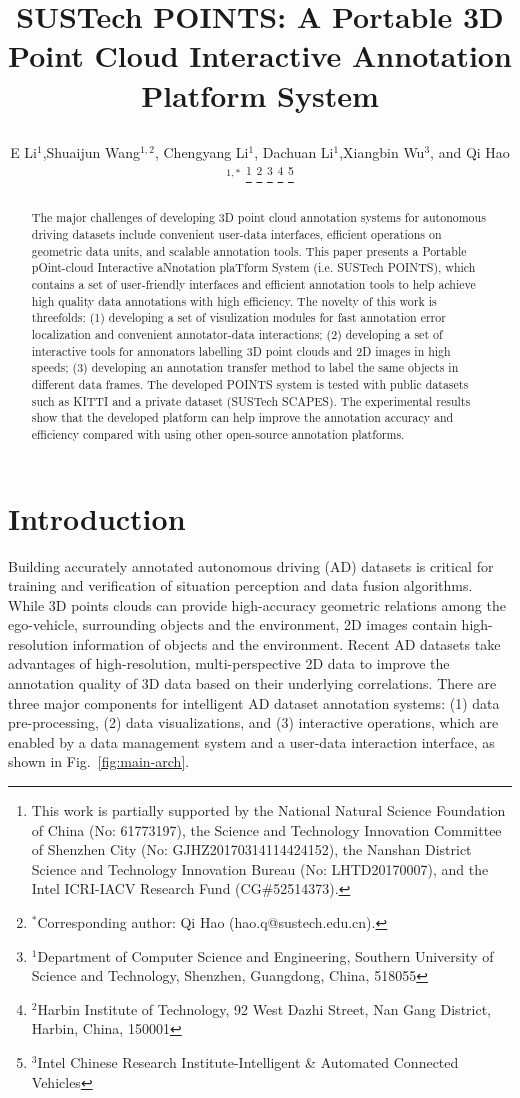 \documentclass[letterpaper, 10 pt, conference]{ieeeconf}  %
\title{\LARGE \bf
SUSTech POINTS: A Portable 3D Point Cloud Interactive Annotation Platform System

}
\author{E Li$^{1}$,Shuaijun Wang$^{1,2}$,  Chengyang Li$^{1}$, Dachuan Li$^{1}$,Xiangbin Wu$^{3}$, and Qi Hao$^{1,*}$%
\thanks{This work is partially supported by the National Natural Science Foundation of China (No: 61773197), the Science and Technology Innovation Committee of Shenzhen City (No: GJHZ20170314114424152), the Nanshan District Science and Technology Innovation Bureau (No: LHTD20170007), and the Intel ICRI-IACV Research Fund (CG$\#$52514373).}
\thanks{$^{*}$Corresponding author: Qi Hao (hao.q@sustech.edu.cn).}
\thanks{$^{1}$Department of Computer Science and Engineering,
Southern University of Science and Technology, Shenzhen, Guangdong, China, 518055}
\thanks{$^{2}$Harbin Institute of Technology,
92 West Dazhi Street, Nan Gang District, Harbin, China, 150001}%
\thanks{$^{3}$Intel Chinese Research Institute-Intelligent \& Automated Connected Vehicles}%
}
\begin{document}
\maketitle
\thispagestyle{empty}
\pagestyle{empty}
\begin{abstract}

The major challenges of developing 3D point cloud annotation systems for autonomous driving datasets include
convenient user-data interfaces, efficient operations on geometric data units, and scalable annotation tools. 
This paper presents a {Portable pOint-cloud Interactive aNnotation plaTform System} (i.e. SUSTech POINTS), 
which contains a set of user-friendly interfaces and efficient annotation tools to help achieve high quality data annotations with high efficiency. 
The novelty of this work is threefolds: 
(1) developing a set of visulization modules for fast annotation error localization and convenient annotator-data interactions; 
(2) developing a set of interactive tools for annonators labelling 3D point clouds and 2D images in high speeds;
(3) developing an annotation transfer method to label the same objects in different data frames. 
The developed POINTS system is tested with public datasets such as KITTI and a private dataset (SUSTech SCAPES). 
The experimental results show that the developed platform can help improve the annotation accuracy and efficiency 
compared with using other open-source annotation platforms.



\end{abstract}






\section{Introduction}


Building accurately annotated autonomous driving (AD) datasets is critical for training and verification of situation perception and data fusion algorithms. 
While 3D points clouds can provide high-accuracy geometric relations among the ego-vehicle, surrounding objects and the environment, 
2D images contain high-resolution information of objects and the environment. 
Recent AD datasets take advantages of high-resolution, multi-perspective 2D data to improve the annotation quality of 3D data 
based on their underlying correlations. 
There are three major components for intelligent AD dataset annotation systems: 
(1) data pre-processing, (2) data visualizations, and (3) interactive operations, 
which are enabled by a data management system and a user-data interaction interface, as shown in Fig.~\ref{fig:main-arch}.
\end{document}
